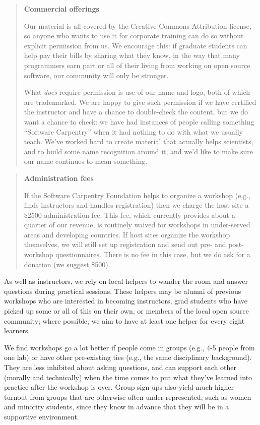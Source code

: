 \documentclass[10pt,a4paper,twocolumn]{article}
\begin{document}
\begin{quote}
\textbf{Commercial offerings}

Our material \cite{swcsite,swcgithub} is all covered by the Creative
Commons Attribution license, so anyone who wants to use it for
corporate training can do so without explicit permission from us. We
encourage this: if graduate students can help pay their bills by
sharing what they know, in the way that many programmers earn part or
all of their living from working on open source software, our
community will only be stronger.

What \emph{does} require permission is use of our name and logo, both
of which are trademarked. We are happy to give such permission if we
have certified the instructor and have a chance to double-check the
content, but we do want a chance to check: we have had instances of
people calling something ``Software Carpentry'' when it had nothing to
do with what we usually teach. We've worked hard to create material
that actually helps scientists, and to build some name recognition
around it, and we'd like to make sure our name continues to mean
something.
\end{quote}

\begin{quote}
\textbf{Administration fees}

If the Software Carpentry Foundation helps to organize a workshop
(e.g., finds instructors and handles registration) then we charge the
host site a \$2500 administration fee.  This fee, which currently
provides about a quarter of our revenue, is routinely waived for
workshops in under-served areas and developing countries.  If host
sites organize the workshop themselves, we will still set up
registration and send out pre- and post-workshop questionnaires.
There is no fee in this case, but we do ask for a donation (we suggest
\$500).

\end{quote}

As well as instructors, we rely on local helpers to wander the room
and answer questions during practical sessions. These helpers may be
alumni of previous workshops who are interested in becoming
instructors, grad students who have picked up some or all of this on
their own, or members of the local open source community; where
possible, we aim to have at least one helper for every eight learners.

We find workshops go a lot better if people come in groups (e.g., 4-5
people from one lab) or have other pre-existing ties (e.g., the same
disciplinary background). They are less inhibited about asking
questions, and can support each other (morally and technically) when
the time comes to put what they've learned into practice after the
workshop is over. Group sign-ups also yield much higher turnout from
groups that are otherwise often under-represented, such as women and
minority students, since they know in advance that they will be in a
supportive environment.
\end{document}
